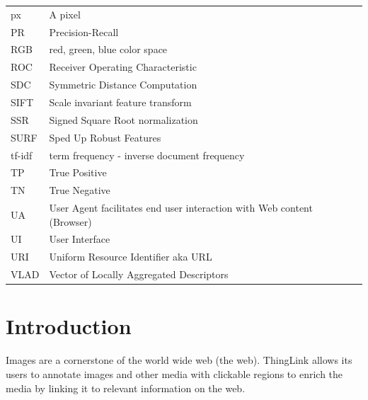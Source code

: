 \documentclass[english,12pt,a4paper,pdftex,elec,utf8]{aaltothesis}
\begin{document}
\begin{tabular}{ll}
  px & A pixel  \\
  PR & Precision-Recall\\
  RGB & red, green, blue color space\\
  ROC & Receiver Operating Characteristic\\
  SDC & Symmetric Distance Computation\\
  SIFT & Scale invariant feature transform \\
  SSR & Signed Square Root normalization\\
  SURF & Sped Up Robust Features \\
  tf-idf & term frequency - inverse document frequency\\
  TP & True Positive\\
  TN & True Negative\\
  UA   & User Agent facilitates end user interaction with Web content (Browser)\\
  UI   & User Interface\\
  URI  & Uniform Resource Identifier aka URL\\
  VLAD & Vector of Locally Aggregated Descriptors\\
\end{tabular}

\cleardoublepage
\storeinipagenumber
{}
\setcounter{page}{1}


\section{Introduction}

\thispagestyle{empty}

Images are a cornerstone of the world wide web (the web). ThingLink allows its users to annotate images and other media with clickable regions to enrich the media by linking it to relevant information on the web.
\end{document}
